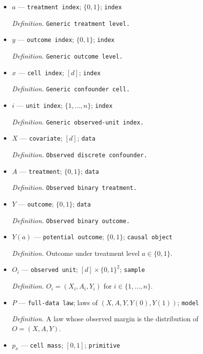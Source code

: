 \documentclass{article}
\begin{document}
\begin{itemize}
  \par\smallskip\noindent\emph{Definition.} \([d]=\{1,\ldots,d\}\).
  \item \(a\) --- \texttt{treatment index}; \(\{0,1\}\); \texttt{index}
  \par\smallskip\noindent\emph{Definition.} \texttt{Generic treatment level.}
  \item \(y\) --- \texttt{outcome index}; \(\{0,1\}\); \texttt{index}
  \par\smallskip\noindent\emph{Definition.} \texttt{Generic outcome level.}
  \item \(x\) --- \texttt{cell index}; \([d]\); \texttt{index}
  \par\smallskip\noindent\emph{Definition.} \texttt{Generic confounder cell.}
  \item \(i\) --- \texttt{unit index}; \(\{1,\ldots,n\}\); \texttt{index}
  \par\smallskip\noindent\emph{Definition.} \texttt{Generic observed-\allowbreak{}unit index.}
  \item \(X\) --- \texttt{covariate}; \([d]\); \texttt{data}
  \par\smallskip\noindent\emph{Definition.} \texttt{Observed discrete confounder.}
  \item \(A\) --- \texttt{treatment}; \(\{0,1\}\); \texttt{data}
  \par\smallskip\noindent\emph{Definition.} \texttt{Observed binary treatment.}
  \item \(Y\) --- \texttt{outcome}; \(\{0,1\}\); \texttt{data}
  \par\smallskip\noindent\emph{Definition.} \texttt{Observed binary outcome.}
  \item \(Y(a)\) --- \texttt{potential outcome}; \(\{0,1\}\); \texttt{causal object}
  \par\smallskip\noindent\emph{Definition.} Outcome under treatment level \(a\in\{0,1\}\).
  \item \(O_i\) --- \texttt{observed unit}; \([d]\times\{0,1\}^2\); \texttt{sample}
  \par\smallskip\noindent\emph{Definition.} \(O_i=(X_i,A_i,Y_i)\) for \(i\in\{1,\ldots,n\}\).
  \item \(P\) --- \texttt{full-\allowbreak{}data law}; laws of \((X,A,Y,Y(0),Y(1))\); \texttt{model}
  \par\smallskip\noindent\emph{Definition.} A law whose observed margin is the distribution of \(O=(X,A,Y)\).
  \item \(p_x\) --- \texttt{cell mass}; \([0,1]\); \texttt{primitive}

\end{itemize}
\end{document}

